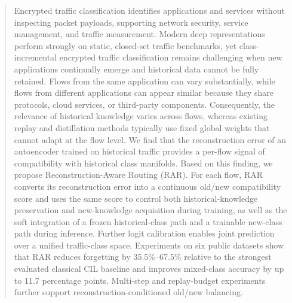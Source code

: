%
%

\begin{abstract}
Encrypted traffic classification identifies applications and services without inspecting packet payloads, supporting network security, service management, and traffic measurement. Modern deep representations perform strongly on static, closed-set traffic benchmarks, yet class-incremental encrypted traffic classification remains challenging when new applications continually emerge and historical data cannot be fully retained. Flows from the same application can vary substantially, while flows from different applications can appear similar because they share protocols, cloud services, or third-party components. Consequently, the relevance of historical knowledge varies across flows, whereas existing replay and distillation methods typically use fixed global weights that cannot adapt at the flow level. We find that the reconstruction error of an autoencoder trained on historical traffic provides a per-flow signal of compatibility with historical class manifolds. Based on this finding, we propose Reconstruction-Aware Routing (RAR). For each flow, RAR converts its reconstruction error into a continuous old/new compatibility score and uses the same score to control both historical-knowledge preservation and new-knowledge acquisition during training, as well as the soft integration of a frozen historical-class path and a trainable new-class path during inference. Further logit calibration enables joint prediction over a unified traffic-class space. Experiments on six public datasets show that RAR reduces forgetting by 35.5\%--67.5\% relative to the strongest evaluated classical CIL baseline and improves mixed-class accuracy by up to 11.7 percentage points. Multi-step and replay-budget experiments further support reconstruction-conditioned old/new balancing.
\end{abstract}

